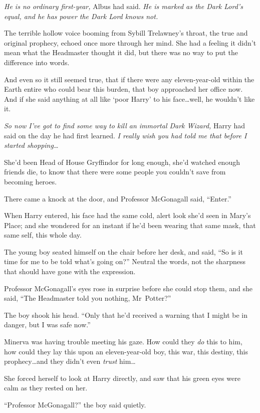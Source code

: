 \emph{He is no ordinary first-year,} Albus had said. \emph{He is marked as the Dark Lord’s equal, and he has power the Dark Lord knows not.}

The terrible hollow voice booming from Sybill Trelawney’s throat, the true and original prophecy, echoed once more through her mind. She had a feeling it didn’t mean what the Headmaster thought it did, but there was no way to put the difference into words.

And even so it still seemed true, that if there were any eleven-year-old within the Earth entire who could bear this burden, that boy approached her office now. And if she said anything at all like ‘poor Harry’ to his face…well, he wouldn’t like it.

\emph{So now I’ve got to find some way to kill an immortal Dark Wizard,} Harry had said on the day he had first learned. \emph{I really wish you had told me that before I started shopping…}

She’d been Head of House Gryffindor for long enough, she’d watched enough friends die, to know that there were some people you couldn’t save from becoming heroes.

There came a knock at the door, and Professor McGonagall said, “Enter.”

When Harry entered, his face had the same cold, alert look she’d seen in Mary’s Place; and she wondered for an instant if he’d been wearing that same mask, that same self, this whole day.

The young boy seated himself on the chair before her desk, and said, “So is it time for me to be told what’s going on?” Neutral the words, not the sharpness that should have gone with the expression.

Professor McGonagall’s eyes rose in surprise before she could stop them, and she said, “The Headmaster told you nothing, Mr~Potter?”

The boy shook his head. “Only that he’d received a warning that I might be in danger, but I was safe now.”

Minerva was having trouble meeting his gaze. How could they \emph{do} this to him, how could they lay this upon an eleven-year-old boy, this war, this destiny, this prophecy…and they didn’t even \emph{trust} him…

She forced herself to look at Harry directly, and saw that his green eyes were calm as they rested on her.

“Professor McGonagall?” the boy said quietly.

